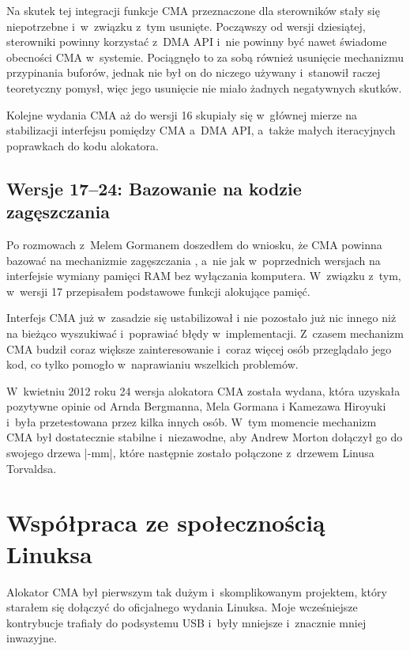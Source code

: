 Na skutek tej integracji funkcje CMA przeznaczone dla sterowników
stały się niepotrzebne i~w~związku z~tym usunięte.  Począwszy od
wersji dziesiątej, sterowniki powinny korzystać z~DMA API i~nie
powinny być nawet świadome obecności CMA w~systemie.  Pociągnęło to za
sobą również usunięcie mechanizmu przypinania buforów, jednak nie był
on do niczego używany i~stanowił raczej teoretyczny pomysł, więc jego
usunięcie nie miało żadnych negatywnych skutków.

Kolejne wydania CMA aż do wersji 16 skupiały się w~głównej mierze na
stabilizacji interfejsu pomiędzy CMA a~DMA API, a~także małych
iteracyjnych poprawkach do kodu alokatora.

\subsection{Wersje 17--24: Bazowanie na kodzie zagęszczania}

Po rozmowach z~Melem Gormanem doszedłem do wniosku, że CMA powinna
bazować na mechanizmie zagęszczania \autocite{bib:compaction,
  bib:supporting-large-contig-regions}, a~nie jak w~poprzednich
wersjach na interfejsie wymiany pamięci RAM bez wyłączania komputera.
W~związku z~tym, w~wersji 17 przepisałem podstawowe funkcji alokujące
pamięć.

Interfejs CMA już w~zasadzie się ustabilizował i nie pozostało już nic
innego niż na bieżąco wyszukiwać i~poprawiać błędy w~implementacji.
Z~czasem mechanizm CMA budził coraz większe zainteresowanie i~coraz
więcej osób przeglądało jego kod, co tylko pomogło w~naprawianiu
wszelkich problemów.

W~kwietniu 2012 roku 24 wersja alokatora CMA została wydana, która
uzyskała pozytywne opinie od Arnda Bergmanna, Mela Gormana i Kamezawa
Hiroyuki i~była przetestowana przez kilka innych osób.  W~tym momencie
mechanizm CMA był dostatecznie stabilne i~niezawodne, aby Andrew
Morton dołączył go do swojego drzewa \code|-mm|, które następnie
zostało połączone z~drzewem Linusa Torvaldsa.

\section{Współpraca ze społecznością Linuksa}

Alokator CMA był pierwszym tak dużym i~skomplikowanym projektem, który
starałem się dołączyć do oficjalnego wydania Linuksa.  Moje
wcześniejsze kontrybucje trafiały do podsystemu USB i~były mniejsze
i~znacznie mniej inwazyjne.


